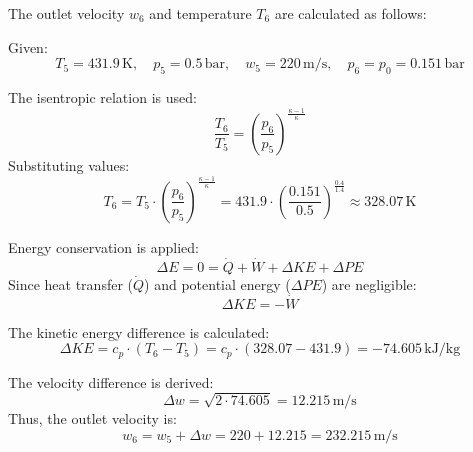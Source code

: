 The outlet velocity \( w_6 \) and temperature \( T_6 \) are calculated as follows:  

Given:  
\[
T_5 = 431.9 \, \text{K}, \quad p_5 = 0.5 \, \text{bar}, \quad w_5 = 220 \, \text{m/s}, \quad p_6 = p_0 = 0.151 \, \text{bar}
\]  

The isentropic relation is used:  
\[
\frac{T_6}{T_5} = \left( \frac{p_6}{p_5} \right)^{\frac{\kappa - 1}{\kappa}}
\]  
Substituting values:  
\[
T_6 = T_5 \cdot \left( \frac{p_6}{p_5} \right)^{\frac{\kappa - 1}{\kappa}} = 431.9 \cdot \left( \frac{0.151}{0.5} \right)^{\frac{0.4}{1.4}} \approx 328.07 \, \text{K}
\]  

Energy conservation is applied:  
\[
\Delta E = 0 = \dot{Q} + \dot{W} + \Delta KE + \Delta PE
\]  
Since heat transfer (\( \dot{Q} \)) and potential energy (\( \Delta PE \)) are negligible:  
\[
\Delta KE = -\dot{W}
\]  

The kinetic energy difference is calculated:  
\[
\Delta KE = c_p \cdot (T_6 - T_5) = c_p \cdot (328.07 - 431.9) = -74.605 \, \text{kJ/kg}
\]  

The velocity difference is derived:  
\[
\Delta w = \sqrt{2 \cdot 74.605} = 12.215 \, \text{m/s}
\]  
Thus, the outlet velocity is:  
\[
w_6 = w_5 + \Delta w = 220 + 12.215 = 232.215 \, \text{m/s}
\]